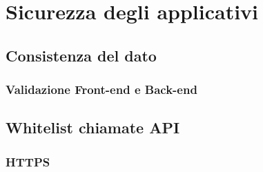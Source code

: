 \chapter{Sicurezza degli applicativi}
\section{Consistenza del dato}
\subsection{Validazione Front-end e Back-end}

\section{Whitelist chiamate API}
\subsection{HTTPS}